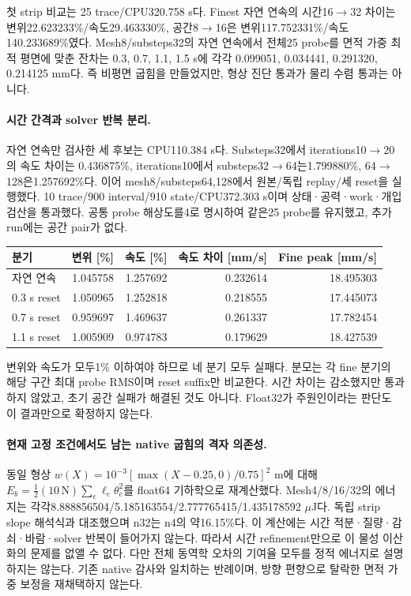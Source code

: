 \documentclass[10pt]{article}
\begin{document}
첫 strip 비교는 25 trace/CPU320.758 s다. Finest 자연 연속의 시간16$\to$32 차이는
변위22.623233\%/속도29.463330\%, 공간8$\to$16은 변위117.752331\%/속도140.233689\%였다.
Mesh8/substeps32의 자연 연속에서 전체25 probe를 면적 가중 최적 평면에 맞춘 잔차는
0.3, 0.7, 1.1, 1.5 s에 각각 0.099051, 0.034441, 0.291320, 0.214125 mm다.
즉 비평면 굽힘을 만들었지만, 형상 진단 통과가 물리 수렴 통과는 아니다.

\paragraph{시간 간격과 solver 반복 분리.}
자연 연속만 검사한 세 후보는 CPU110.384 s다. Substeps32에서 iterations10$\to$20의 속도 차이는
0.436875\%, iterations10에서 substeps32$\to$64는1.799880\%, 64$\to$128은1.257692\%다.
이어 mesh8/substeps64,128에서 원본/독립 replay/세 reset을 실행했다.
10 trace/900 interval/910 state/CPU372.303 s이며 상태·공력·work·개입 검산을 통과했다.
공통 probe 해상도를4로 명시하여 같은25 probe를 유지했고, 추가 run에는 공간 pair가 없다.
\begin{longtable}{lrrrr}
\toprule 분기 & 변위 [\%] & 속도 [\%] & 속도 차이 [mm/s] & Fine peak [mm/s]\\\midrule
자연 연속 & 1.045758 & 1.257692 & 0.232614 & 18.495303\\
0.3 s reset & 1.050965 & 1.252818 & 0.218555 & 17.445073\\
0.7 s reset & 0.959697 & 1.469637 & 0.261337 & 17.782454\\
1.1 s reset & 1.005909 & 0.974783 & 0.179629 & 18.427539\\
\bottomrule\end{longtable}
변위와 속도가 모두1\% 이하여야 하므로 네 분기 모두 실패다. 분모는 각 fine 분기의
해당 구간 최대 probe RMS이며 reset suffix만 비교한다. 시간 차이는 감소했지만 통과하지 않았고,
초기 공간 실패가 해결된 것도 아니다. Float32가 주원인이라는 판단도 이 결과만으로 확정하지 않는다.

\paragraph{현재 고정 조건에서도 남는 native 굽힘의 격자 의존성.}
동일 형상 \(w(X)=10^{-3}[\max(X-0.25,0)/0.75]^2\) m에 대해
\(E_b=\tfrac12(10\,\mathrm{N})\sum_e\ell_e\theta_e^2\)를 float64 기하학으로 재계산했다.
Mesh4/8/16/32의 에너지는 각각8.888856504/5.185163554/2.777765415/1.435178592 $\mu$J다.
독립 strip slope 해석식과 대조했으며 n32는 n4의 약16.15\%다.
이 계산에는 시간 적분·질량·감쇠·바람·solver 반복이 들어가지 않는다.
따라서 시간 refinement만으로 이 물성 이산화의 문제를 없앨 수 없다.
다만 전체 동역학 오차의 기여율 모두를 정적 에너지로 설명하지는 않는다.
기존 native 감사와 일치하는 반례이며, 방향 편향으로 탈락한 면적 가중 보정을 재채택하지 않는다.
\end{document}
